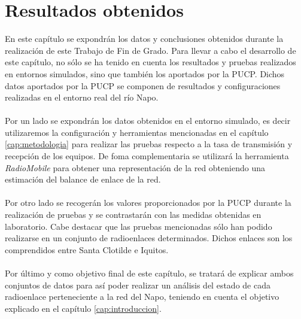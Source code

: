 \chapter{Resultados obtenidos}
\label{cap:resultaldos_obtenidos}

En este capítulo se expondrán los datos y conclusiones obtenidos durante la realización de este Trabajo de Fin de Grado. Para llevar a cabo el desarrollo de este capítulo, no sólo se ha tenido en cuenta los resultados y pruebas realizados en entornos simulados, sino que también los aportados por la PUCP. Dichos datos aportados por la PUCP se componen de resultados y configuraciones realizadas en el entorno real del río Napo.\\\\

Por un lado se expondrán los datos obtenidos en el entorno simulado, es decir utilizaremos la configuración y herramientas mencionadas en el capítulo \ref{cap:metodologia} para realizar las pruebas respecto a la tasa de transmisión y recepción de los equipos. De foma complementaria se utilizará la herramienta \textit{RadioMobile} para obtener una representación de la red obteniendo una estimación del balance de enlace de la red.\\\\ 

Por otro lado se recogerán los valores proporcionados por la PUCP durante la realización de pruebas y se contrastarán con las medidas obtenidas en laboratorio. Cabe destacar que las pruebas mencionadas sólo han podido realizarse en un conjunto de radioenlaces determinados. Dichos enlaces son los comprendidos entre Santa Clotilde e Iquitos.\\\\

Por último y como objetivo final de este capítulo, se tratará de explicar ambos conjuntos de datos para así poder realizar un análisis del estado de cada radioenlace perteneciente a la red del Napo, teniendo en cuenta el objetivo explicado en el capítulo \ref{cap:introduccion}.
 
